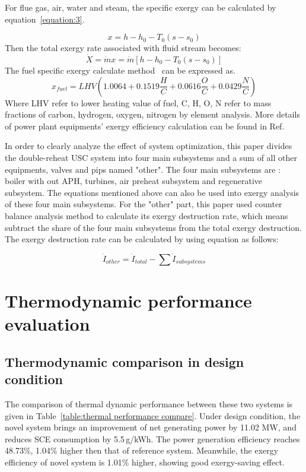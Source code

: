 \documentclass[preprint,12pt]{elsarticle}
\begin{document}
For flue gas, air, water and steam, the specific exergy can be calculated by equation~\ref{equation:3}.

\begin{equation}{}
\label{equation:3}
x=h-h_{0}-T_{0}\left(s-s_{0}\right)
\end{equation}
Then the total exergy rate associated with ﬂuid stream becomes:
\begin{equation}
\dot{X}=\dot{m}x=\dot{m}\left[h-h_{0}-T_{0}\left(s-s_{0}\right)\right]{}
\end{equation}
The fuel specific exergy calculate method~\cite{Yan2016The} can be expressed as.
\begin{equation}
x_{fuel}=LHV\left(1.0064+0.1519\frac{H}{C}+0.0616\frac{O}{C}+0.0429\frac{N}{C}\right)
\end{equation}
Where LHV refer to lower heating value of fuel, C, H, O, N refer to mass fractions of carbon, hydrogen, oxygen, nitrogen by element analysis.
More details of power plant equipments' exergy  efficiency calculation can be found in Ref.~\cite{G2016Exergy}

In order to clearly analyze the effect of system optimization, this paper divides the double-reheat USC system into four main subsystems and a sum of all other equipments, valves and pips named "other".
The four main subsystems are : boiler with out APH, turbines, air preheat subsystem and regenerative subsystem.
The equations mentioned above can also be used into exergy analysis of these four main subsystems.
For the "other" part, this paper used counter balance analysis method to calculate its exergy destruction rate, which means subtract the share of the four main subsystems from the total exergy destruction.
The exergy destruction rate can be calculated by using equation as follows:

\begin{equation}
\dot{I}_{other}=\dot{I}{}_{total}-\sum\dot{I}{}_{subsystems}
\end{equation}


\section{Thermodynamic performance evaluation} %
\label{sub:Thermodynamic_evaluation}
\subsection{Thermodynamic comparison in design condition}
\label{ssub:desing_compare}
The comparison of thermal dynamic performance between these two systems is given in Table~\ref{table:thermal performance compare}. 
Under design condition, the novel system brings an improvement of net generating power by 11.02 MW, and reduces SCE consumption by 5.5\,g/kWh.
The power generation efficiency reaches 48.73\%, 1.04\% higher then that of reference system.
Meanwhile, the exergy efficiency of novel system is 1.01\% higher, showing good exergy-saving effect. 
\end{document}

